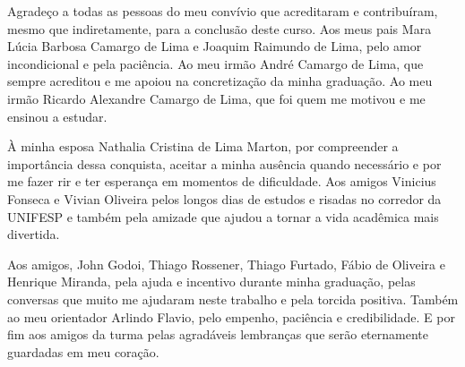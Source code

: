 \begin{agradecimentos}


    Agradeço a todas as pessoas do meu convívio que acreditaram e contribuíram, mesmo que indiretamente, para a conclusão deste curso.
Aos meus pais Mara Lúcia Barbosa Camargo de Lima e Joaquim Raimundo de Lima, pelo amor incondicional e pela paciência. Ao meu irmão André Camargo de Lima, que sempre acreditou e me apoiou na concretização da minha graduação. Ao meu irmão Ricardo Alexandre Camargo de Lima, que foi quem me motivou e me ensinou a estudar. 

    À minha esposa Nathalia Cristina de Lima Marton, por compreender a importância dessa conquista, aceitar a minha ausência quando necessário e por me fazer rir e ter esperança em momentos de dificuldade.
Aos amigos Vinicius Fonseca e Vivian Oliveira pelos longos dias de estudos e risadas no corredor da UNIFESP e também pela amizade que ajudou a tornar a vida acadêmica mais divertida.

    Aos amigos, John Godoi, Thiago Rossener, Thiago Furtado, Fábio de Oliveira  e Henrique Miranda, pela ajuda e incentivo durante minha graduação, pelas conversas que muito me ajudaram neste trabalho e pela torcida positiva.
Também ao meu orientador Arlindo Flavio, pelo empenho, paciência e credibilidade. E por fim aos amigos da turma pelas agradáveis lembranças que serão eternamente guardadas em meu coração.

\end{agradecimentos}